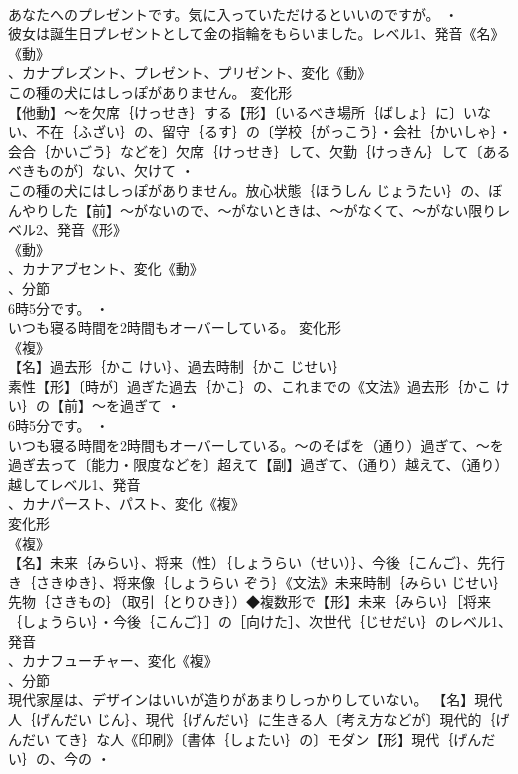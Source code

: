 \documentclass[8pt]{extreport}
\begin{document}
\begin{CJK}{UTF8}{min}
\\	あなたへのプレゼントです。気に入っていただけるといいのですが。 ・
\\	彼女は誕生日プレゼントとして金の指輪をもらいました。レベル1、発音《名》
\\	《動》
\\	、カナプレズント、プレゼント、プリゼント、変化《動》
\\	この種の犬にはしっぽがありません。	変化形 
\\	【他動】～を欠席｛けっせき｝する【形】〔いるべき場所｛ばしょ｝に〕いない、不在｛ふざい｝の、留守｛るす｝の〔学校｛がっこう｝・会社｛かいしゃ｝・会合｛かいごう｝などを〕欠席｛けっせき｝して、欠勤｛けっきん｝して〔あるべきものが〕ない、欠けて ・
\\	この種の犬にはしっぽがありません。放心状態｛ほうしん じょうたい｝の、ぼんやりした【前】～がないので、～がないときは、～がなくて、～がない限りレベル2、発音《形》
\\	《動》
\\	、カナアブセント、変化《動》
\\	、分節
\\	6時5分です。 ・
\\	いつも寝る時間を2時間もオーバーしている。	変化形 
\\	《複》
\\	【名】過去形｛かこ けい｝、過去時制｛かこ じせい｝
\\	素性【形】〔時が〕過ぎた過去｛かこ｝の、これまでの《文法》過去形｛かこ けい｝の【前】～を過ぎて ・
\\	6時5分です。 ・
\\	いつも寝る時間を2時間もオーバーしている。～のそばを（通り）過ぎて、～を過ぎ去って〔能力・限度などを〕超えて【副】過ぎて、（通り）越えて、（通り）越してレベル1、発音
\\	、カナパースト、パスト、変化《複》
\\	変化形 
\\	《複》
\\	【名】未来｛みらい｝、将来（性）｛しょうらい（せい）｝、今後｛こんご｝、先行き｛さきゆき｝、将来像｛しょうらい ぞう｝《文法》未来時制｛みらい じせい｝先物｛さきもの｝（取引｛とりひき｝）◆複数形で【形】未来｛みらい｝［将来｛しょうらい｝・今後｛こんご｝］の［向けた］、次世代｛じせだい｝のレベル1、発音
\\	、カナフューチャー、変化《複》
\\	、分節
\\	現代家屋は、デザインはいいが造りがあまりしっかりしていない。		【名】現代人｛げんだい じん｝、現代｛げんだい｝に生きる人〔考え方などが〕現代的｛げんだい てき｝な人《印刷》〔書体｛しょたい｝の〕モダン【形】現代｛げんだい｝の、今の ・

\end{CJK}
\end{document}
